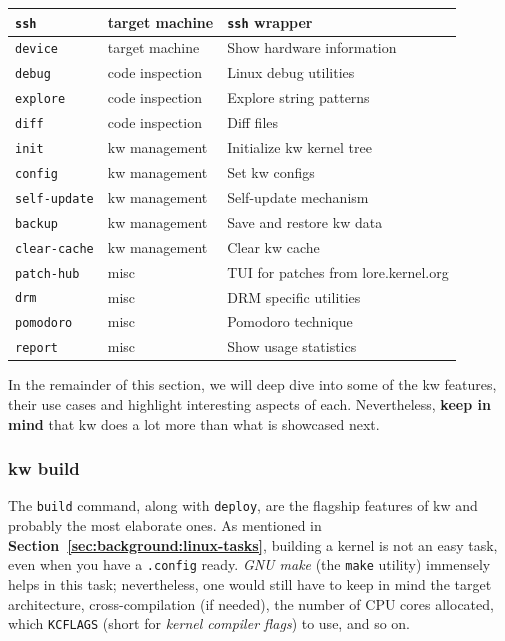 \begin{table}[ht]
\begin{center}
\begin{tabular}{|p{}|p{}|p{}|}
        \texttt{ssh}    & target machine    & \texttt{ssh} wrapper \\\hline
        \texttt{device}    & target machine    & Show hardware information \\\hline
        \texttt{debug}    & code inspection    & Linux debug utilities \\\hline
        \texttt{explore}    & code inspection    & Explore string patterns \\\hline
        \texttt{diff}    & code inspection    & Diff files \\\hline
        \texttt{init}    & kw management    & Initialize kw kernel tree \\\hline
        \texttt{config}    & kw management    & Set kw configs \\\hline
        \texttt{self-update}    & kw management    & Self-update mechanism \\\hline
        \texttt{backup}    & kw management    & Save and restore kw data \\\hline
        \texttt{clear-cache}    & kw management    & Clear kw cache \\\hline
        \texttt{patch-hub}    & misc    & TUI for patches from lore.kernel.org \\\hline
        \texttt{drm}    & misc    & DRM specific utilities \\\hline
        \texttt{pomodoro}    & misc    & Pomodoro technique \\\hline
        \texttt{report}    & misc    & Show usage statistics \\\hline
    \end{tabular}
    \end{center}
\end{table}

In the remainder of this section, we will deep dive into some of the kw
features, their use cases and highlight interesting aspects of each.
Nevertheless, \textbf{keep in mind} that kw does a lot more than what is
showcased next.

\subsubsection{kw build}

The \texttt{build} command, along with \texttt{deploy}, are the flagship
features of kw and probably the most elaborate ones. As mentioned in
\textbf{Section~\ref{sec:background:linux-tasks}}, building a kernel is not an
easy task, even when you have a \texttt{.config} ready. \textit{GNU make} (the
\texttt{make} utility) immensely helps in this task; nevertheless, one would
still have to keep in mind the target architecture, cross-compilation (if
needed), the number of CPU cores allocated, which \texttt{KCFLAGS} (short for
\textit{kernel compiler flags}) to use, and so on.

